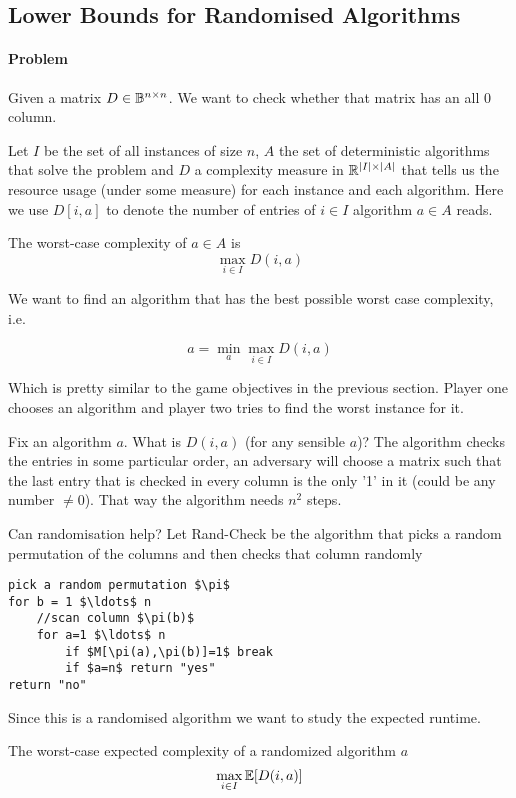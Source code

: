 \subsection{Lower Bounds for Randomised Algorithms}

\paragraph{Problem} Given a matrix $D\in \mathbb{B}^{n\times n}$. We want to check whether that matrix has an all 0 column. 

Let $I$ be the set of all instances of size $n$, $A$ the set of deterministic algorithms that solve the problem and $D$ a complexity measure in $\mathbb{R}^{|I| \times |A|}$ that tells us the resource usage (under some measure) for each instance and each algorithm. Here we use $D[i,a]$ to denote the number of entries of $i\in I$ algorithm $a\in A$ reads.

\begin{Def} The worst-case complexity of $a\in A$ is 
\[\max_{i\in I} D(i,a)\]
\end{Def}

We want to find an algorithm that has the best possible worst case complexity, i.e.

\[a = \min_a \max_{i\in I} D(i,a)\]

Which is pretty similar to the game objectives in the previous section. Player one chooses an algorithm and player two tries to find the worst instance for it.

Fix an algorithm $a$. What is $D(i,a)$ (for any sensible $a$)? The algorithm checks the entries in some particular order, an adversary will choose a matrix such that the last entry that is checked in every column is the only '1' in it (could be any number $\neq 0$). That way the algorithm needs $n^2$ steps.

Can randomisation help? Let {\sc Rand-Check} be the algorithm that picks a random permutation of the columns and then checks that column randomly

\begin{lstlisting}
pick a random permutation $\pi$
for b = 1 $\ldots$ n
	//scan column $\pi(b)$
	for a=1 $\ldots$ n
		if $M[\pi(a),\pi(b)]=1$ break
		if $a=n$ return "yes"
return "no"
\end{lstlisting}

Since this is a randomised algorithm we want to study the expected runtime. 

\begin{Def} The worst-case expected complexity of a randomized algorithm $a$
\[\max_{i\in I} \mathbb{E}[D(i,a)]\]
\end{Def}

